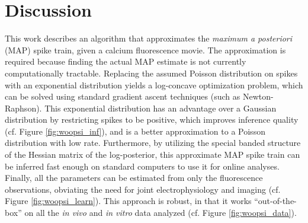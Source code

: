 \section{Discussion} \label{sec:dis}


This work describes an algorithm that approximates the \emph{maximum a posteriori} (MAP) spike train, given a calcium fluorescence movie.  The approximation is required because finding the actual MAP estimate is not currently computationally tractable.  Replacing the assumed Poisson distribution on spikes with an exponential distribution yields a log-concave optimization problem, which can be solved using standard gradient ascent techniques (such as Newton-Raphson).  This exponential distribution has an advantage over a Gaussian distribution by restricting spikes to be positive, which improves inference quality (cf. Figure \ref{fig:woopsi_inf}), and is a better approximation to a Poisson distribution with low rate.  %
Furthermore, by utilizing the special banded structure of the Hessian matrix of the log-posterior, this approximate MAP spike train can be inferred fast enough on standard computers to use it for online analyses.  Finally, all the parameters can be estimated from only the fluorescence observations, obviating the need for joint electrophysiology and imaging (cf. Figure \ref{fig:woopsi_learn}).  This approach is robust, in that it works ``out-of-the-box'' on all the \emph{in vivo} and \emph{in vitro} data analyzed (cf. Figure \ref{fig:woopsi_data}).

